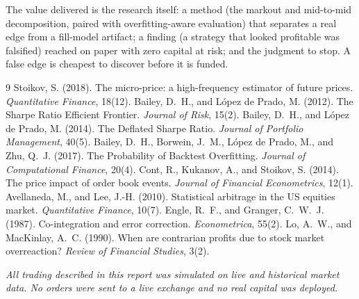 \documentclass[11pt]{article}
\begin{document}
The value delivered is the research itself: a method (the markout and mid-to-mid decomposition,
paired with overfitting-aware evaluation) that separates a real edge from a fill-model artifact;
a finding (a strategy that looked profitable was falsified) reached on paper with zero capital at
risk; and the judgment to stop. A false edge is cheapest to discover before it is funded.

\begingroup
\small
\begin{thebibliography}{9}
 Stoikov, S. (2018). The micro-price: a high-frequency estimator of future prices. \emph{Quantitative Finance}, 18(12).
 Bailey, D.~H., and L\'opez de Prado, M. (2012). The Sharpe Ratio Efficient Frontier. \emph{Journal of Risk}, 15(2).
 Bailey, D.~H., and L\'opez de Prado, M. (2014). The Deflated Sharpe Ratio. \emph{Journal of Portfolio Management}, 40(5).
 Bailey, D.~H., Borwein, J.~M., L\'opez de Prado, M., and Zhu, Q.~J. (2017). The Probability of Backtest Overfitting. \emph{Journal of Computational Finance}, 20(4).
 Cont, R., Kukanov, A., and Stoikov, S. (2014). The price impact of order book events. \emph{Journal of Financial Econometrics}, 12(1).
 Avellaneda, M., and Lee, J.-H. (2010). Statistical arbitrage in the US equities market. \emph{Quantitative Finance}, 10(7).
 Engle, R.~F., and Granger, C.~W.~J. (1987). Co-integration and error correction. \emph{Econometrica}, 55(2).
 Lo, A.~W., and MacKinlay, A.~C. (1990). When are contrarian profits due to stock market overreaction? \emph{Review of Financial Studies}, 3(2).
\end{thebibliography}
\endgroup

\vfill
{\footnotesize\noindent\textit{All trading described in this report was simulated on live and
historical market data. No orders were sent to a live exchange and no real capital was deployed.}}
\end{document}
